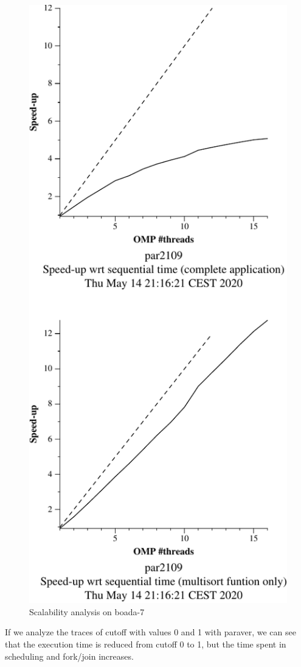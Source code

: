 \begin{figure}[H]
\begin{minipage}{0.5\textwidth}
        \includegraphics[width=0.7\linewidth]{plots/new-omp-tree-cutoff_boada7-crop.pdf}
        \caption{Scalability analysis on boada-7}
        \label{fig:cutoffboada7} 
    \end{minipage}
\end{figure}

If we analyze the traces of cutoff with values 0 and 1 with paraver, we can see that the execution time is reduced
from cutoff 0 to 1, but the time spent in scheduling and fork/join increases.


